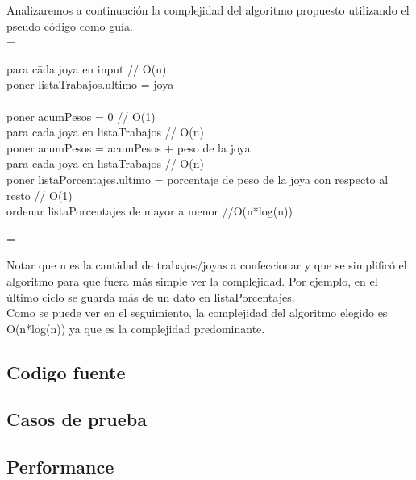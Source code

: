 Analizaremos a continuaci\'on la complejidad del algoritmo propuesto utilizando el pseudo c\'odigo como gu\'ia.\\

\hangindent=\parindent
\begin{tabbing}
para c\=ada  joya en input						\/// O(n) \\
	\>poner listaTrabajos.ultimo = joya	\\ \\

poner acumPesos = 0				\/// O(1) \\
para cada joya en listaTrabajos \/// O(n) \\
	\>poner acumPesos = acumPesos + peso de la joya  \\
	
para cada joya en listaTrabajos \/// O(n) \\
	\>poner listaPorcentajes.ultimo = porcentaje de peso de la joya con respecto al resto   \/// O(1) \\

ordenar listaPorcentajes de mayor a menor   \///O(n*log(n)) \\
\end{tabbing}
\hangindent=\parindent

Notar que n es la cantidad de trabajos/joyas a confeccionar y que se simplific\'o el algoritmo para que fuera m\'as simple ver la complejidad. Por ejemplo, en el \'ultimo ciclo se guarda m\'as de un dato en listaPorcentajes.\\

Como se puede ver en el seguimiento, la complejidad del algoritmo elegido es O(n*log(n)) ya que es la complejidad predominante.\\

\subsection{Codigo fuente}

\subsection{Casos de prueba}

\subsection{Performance}
